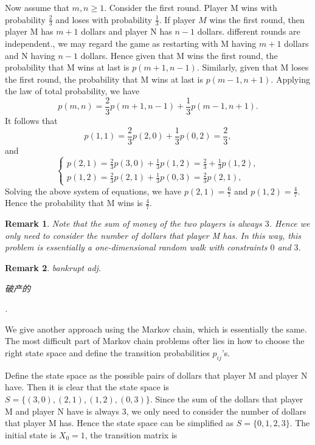 \documentclass[12pt,letterpaper, onecolumn]{exam}
\newtheorem{remark}{Remark}
\begin{document}
\begin{questions}
\begin{solution}
            \quad Now assume that $m,n\ge 1$. Consider the first round. Player M wins with probability $\frac{2}{3}$ and loses with probability $\frac{1}{3}$. If player $M$ wins the first round, then player M has $m+1$ dollars and player N has $n-1$ dollars. different rounds are independent., we may regard the game as restarting with M having $m+1$ dollars and N having $n-1$ dollars. Hence given that M wins the first round, the probability that M wins at last is $p(m+1,n-1)$. Similarly, given that M loses the first round, the probability that M wins at last is $p(m-1,n+1)$. Applying the law of total probability, we have 
            $$p(m,n)=\frac{2}{3}p(m+1,n-1)+\frac{1}{3}p(m-1,n+1).$$
            It follows that 
            $$p(1,1)=\frac{2}{3}p(2,0)+\frac{1}{3}p(0,2)=\frac{2}{3},$$
            and 
            $$\begin{cases}
                p(2,1)=\frac{2}{3}p(3,0)+\frac{1}{3}p(1,2)=\frac{2}{3}+\frac{1}{3}p(1,2),\\
                p(1,2)=\frac{2}{3}p(2,1)+\frac{1}{3}p(0,3)=\frac{2}{3}p(2,1),
            \end{cases}$$
            Solving the above system of equations, we have $p(2,1)=\frac{6}{7}$ and $p(1,2)=\frac{4}{7}$. Hence the probability that M wins is $\frac{4}{7}$.
        \end{solution}
        \begin{remark}
            Note that the sum of money of the two players is always $3$. Hence we only need to consider the number of dollars that player M has. In this way, this problem is essentially a one-dimensional random walk with constraints $0$ and $3$.
        \end{remark}
        \begin{remark}
            bankrupt  adj. \begin{CJK}{UTF8}{gbsn}破产的\end{CJK}.
        \end{remark}
        \quad We give another approach using the Markov chain, which is essentially the same. The most difficult part of Markov chain problems ofter lies in how to choose the right state space and define the transition probabilities $p_{ij}$'s.
        \begin{solution}
            Define the state space as the possible pairs of dollars that player M and player N have. Then it is clear that the state space is $S=\{(3,0),(2,1),(1,2),(0,3)\}$. Since the sum of the dollars that player M and player N have is always $3$, we only need to consider the number of dollars that player M has. Hence the state space can be simplified as $S=\{0,1,2,3\}$. The initial state is $X_0=1$, the transition matrix is 

\end{solution}
\end{questions}
\end{document}
